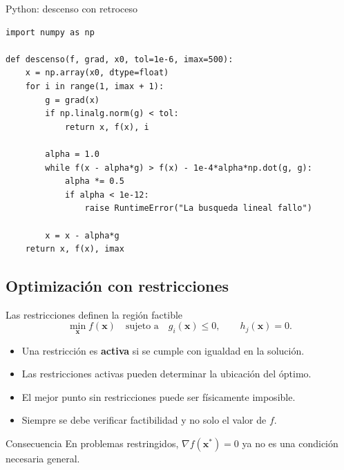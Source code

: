 \documentclass[../../main.tex]{subfiles}
\begin{document}
\begin{frame}[fragile]{Python: descenso con retroceso}
\scriptsize
\begin{lstlisting}[style=mypython]
import numpy as np

def descenso(f, grad, x0, tol=1e-6, imax=500):
    x = np.array(x0, dtype=float)
    for i in range(1, imax + 1):
        g = grad(x)
        if np.linalg.norm(g) < tol:
            return x, f(x), i

        alpha = 1.0
        while f(x - alpha*g) > f(x) - 1e-4*alpha*np.dot(g, g):
            alpha *= 0.5
            if alpha < 1e-12:
                raise RuntimeError("La busqueda lineal fallo")

        x = x - alpha*g
    return x, f(x), imax
\end{lstlisting}
\end{frame}


\subsection{Optimización con restricciones}

\begin{frame}{Las restricciones definen la región factible}
\[
\min_{\mathbf{x}} f(\mathbf{x})
\quad \text{sujeto a} \quad
g_i(\mathbf{x})\le0,
\qquad
h_j(\mathbf{x})=0.
\]

\begin{itemize}
  \item Una restricción es \textbf{activa} si se cumple con igualdad en la solución.
  \item Las restricciones activas pueden determinar la ubicación del óptimo.
  \item El mejor punto sin restricciones puede ser físicamente imposible.
  \item Siempre se debe verificar factibilidad y no solo el valor de $f$.
\end{itemize}

\begin{alertblock}{Consecuencia}
En problemas restringidos, $\nabla f(\mathbf{x}^*)=0$ ya no es una condición necesaria general.
\end{alertblock}
\end{frame}
\end{document}
